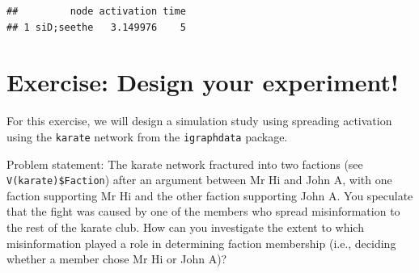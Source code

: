 \documentclass[
]{book}
\newenvironment{Shaded}{\begin{snugshade}}{\end{snugshade}}
\newcommand{\AttributeTok}[1]{\textcolor[rgb]{0.13,0.29,0.53}{#1}}
\newcommand{\CommentTok}[1]{\textcolor[rgb]{0.56,0.35,0.01}{\textit{#1}}}
\newcommand{\ConstantTok}[1]{\textcolor[rgb]{0.56,0.35,0.01}{#1}}
\newcommand{\DecValTok}[1]{\textcolor[rgb]{0.00,0.00,0.81}{#1}}
\newcommand{\FloatTok}[1]{\textcolor[rgb]{0.00,0.00,0.81}{#1}}
\newcommand{\FunctionTok}[1]{\textcolor[rgb]{0.13,0.29,0.53}{\textbf{#1}}}
\newcommand{\NormalTok}[1]{#1}
\newcommand{\OtherTok}[1]{\textcolor[rgb]{0.56,0.35,0.01}{#1}}
\newcommand{\SpecialCharTok}[1]{\textcolor[rgb]{0.81,0.36,0.00}{\textbf{#1}}}
\newcommand{\StringTok}[1]{\textcolor[rgb]{0.31,0.60,0.02}{#1}}
\begin{document}
\begin{Shaded}
\end{Shaded}

\begin{verbatim}
##         node activation time
## 1 siD;seethe   3.149976    5
\end{verbatim}

\section{Exercise: Design your experiment!}\label{exercise-design-your-experiment}

For this exercise, we will design a simulation study using spreading activation using the \texttt{karate} network from the \texttt{igraphdata} package.

Problem statement: The karate network fractured into two factions (see \texttt{V(karate)\$Faction}) after an argument between Mr Hi and John A, with one faction supporting Mr Hi and the other faction supporting John A. You speculate that the fight was caused by one of the members who spread misinformation to the rest of the karate club. How can you investigate the extent to which misinformation played a role in determining faction membership (i.e., deciding whether a member chose Mr Hi or John A)?
\end{document}
